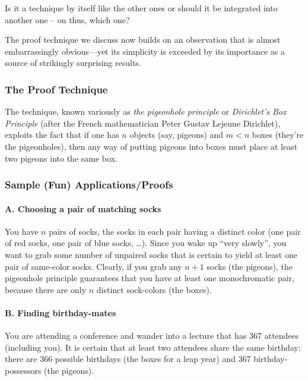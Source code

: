 {\Denis Is it a technique by itself like the other ones or should it be integrated into another one -- on thus, which one?}

The proof technique we discuss now builds on an observation that is
almost embarrassingly obvious---yet its simplicity is exceeded by its
importance as a source of strikingly surprising results.

\subsubsection{The Proof Technique}

The technique, known variously as {\it the pigeonhole principle}
or {\it Dirichlet's Box Principle}
(after the French mathematician Peter Gustav Lejeune Dirichlet),
exploits the fact that if one has $n$ objects (say, pigeons) and $m <
n$ boxes (they're the pigeonholes), then any way of putting pigeons
into boxes must place at least two pigeons into the same box.


\subsubsection{Sample (Fun) Applications/Proofs}
\label{sec:pigeon-apps}


\paragraph{\small\sf A. Choosing a pair of matching socks} 

You have $n$ pairs of socks, the socks in each pair having a distinct
color (one pair of red socks, one pair of blue socks, \ldots).  Since
you wake up ``very slowly'', you want to grab some number of unpaired
socks that is certain to yield at least one pair of same-color socks.
Clearly, if you grab any $n+1$ socks (the pigeons), the pigeonhole
principle guarantees that you have at least one monochromatic pair,
because there are only $n$ distinct sock-colors (the boxes).


\paragraph{\small\sf B. Finding birthday-mates}

You are attending a conference and wander into a lecture that has 367
attendees (including you).  It is certain that at least two attendees
share the same birthday: there are 366 possible birthdays (the boxes
for a leap year) and 367 birthday-possessors (the pigeons).

